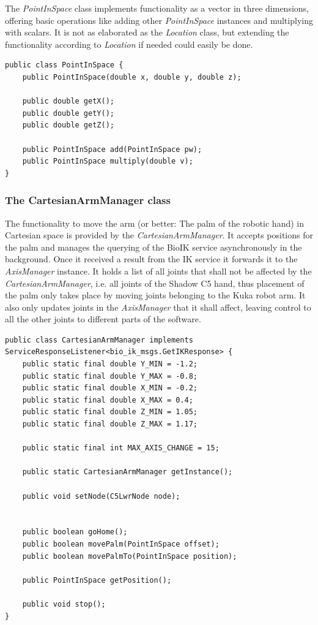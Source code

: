 The \textit{PointInSpace} class implements functionality as a vector in three dimensions, offering basic operations like adding other \textit{PointInSpace} instances and multiplying with scalars. It is not as elaborated as the \textit{Location} class, but extending the functionality according to \textit{Location} if needed could easily be done.

\begin{lstlisting}[caption={The public interface of PointInSpace}]
public class PointInSpace {
	public PointInSpace(double x, double y, double z);
	
	public double getX();
	public double getY();
	public double getZ();
	
	public PointInSpace add(PointInSpace pw);
	public PointInSpace multiply(double v);
}

\end{lstlisting}

\subsubsection{The CartesianArmManager class}

The functionality to move the arm (or better: The palm of the robotic hand) in Cartesian space is provided by the \textit{CartesianArmManager}. It accepts positions for the palm and manages the querying of the BioIK service asynchronously in the background. Once it received a result from the IK service it forwards it to the \textit{AxisManager} instance. It holds a list of all joints that shall not be affected by the \textit{CartesianArmManager}, i.e. all joints of the Shadow C5 hand, thus placement of the palm only takes place by moving joints belonging to the Kuka robot arm. It also only updates joints in the \textit{AxisManager} that it shall affect, leaving control to all the other joints to different parts of the software.

\begin{lstlisting}[caption={The public interface of CartesianArmManager}, label=lst:impl:cartarm]
public class CartesianArmManager implements ServiceResponseListener<bio_ik_msgs.GetIKResponse> {
	public static final double Y_MIN = -1.2;
	public static final double Y_MAX = -0.8;
	public static final double X_MIN = -0.2;
	public static final double X_MAX = 0.4;
	public static final double Z_MIN = 1.05;
	public static final double Z_MAX = 1.17;
	
	public static final int MAX_AXIS_CHANGE = 15;
	
	public static CartesianArmManager getInstance();
	
	public void setNode(C5LwrNode node);
	
	
	public boolean goHome();
	public boolean movePalm(PointInSpace offset);
	public boolean movePalmTo(PointInSpace position);
	
	public PointInSpace getPosition();
	
	public void stop();
}
\end{lstlisting}

